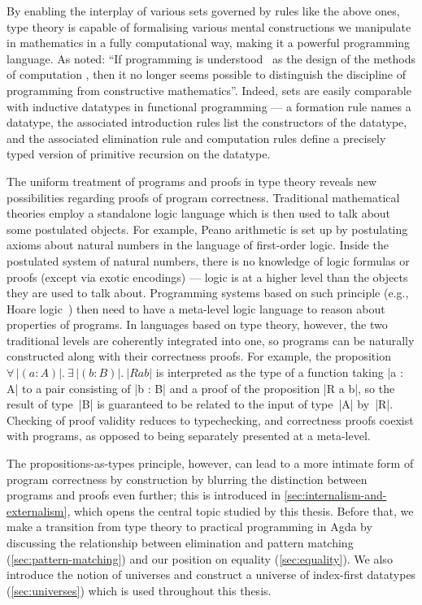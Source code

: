 By enabling the interplay of various sets governed by rules like the above ones, type theory is capable of formalising various mental constructions we manipulate in mathematics in a fully computational way, making it a powerful programming language.
As \citet{ML-constructive-math-programming} noted: ``If programming is understood \omission\ as the design of the methods of computation \omission, then it no longer seems possible to distinguish the discipline of programming from constructive mathematics''.
Indeed, sets are easily comparable with inductive datatypes in functional programming --- a formation rule names a datatype, the associated introduction rules list the constructors of the datatype, and the associated elimination rule and computation rules define a precisely typed version of primitive recursion on the datatype.

The uniform treatment of programs and proofs in type theory reveals new possibilities regarding proofs of program correctness.
Traditional mathematical theories employ a standalone logic language which is then used to talk about some postulated objects.
For example, Peano arithmetic is set up by postulating axioms about natural numbers in the language of first-order logic.
Inside the postulated system of natural numbers, there is no knowledge of logic formulas or proofs (except via exotic encodings) --- logic is at a higher level than the objects they are used to talk about.
Programming systems based on such principle (e.g., Hoare logic~\citep{Hoare-logic}) then need to have a meta-level logic language to reason about properties of programs.
In languages based on type theory, however, the two traditional levels are coherently integrated into one, so programs can be naturally constructed along with their correctness proofs.
For example, the proposition $\forall\,|(a : A)|.~\exists\,|(b : B)|.~|R a b|$ is interpreted as the type of a function taking |a : A| to a pair consisting of |b : B| and a proof of the proposition |R a b|, so the result of type~|B| is guaranteed to be related to the input of type~|A| by~|R|.
Checking of proof validity reduces to typechecking, and correctness proofs coexist with programs, as opposed to being separately presented at a meta-level.

The propositions-as-types principle, however, can lead to a more intimate form of program correctness by construction by blurring the distinction between programs and proofs even further; this is introduced in \autoref{sec:internalism-and-externalism}, which opens the central topic studied by this thesis.
Before that, we make a transition from type theory to practical programming in Agda by discussing the relationship between elimination and pattern matching (\autoref{sec:pattern-matching}) and our position on equality (\autoref{sec:equality}).
We also introduce the notion of universes and construct a universe of index-first datatypes (\autoref{sec:universes}) which is used throughout this thesis.

